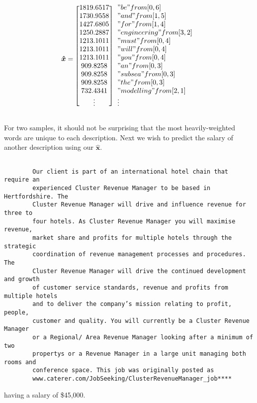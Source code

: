 \documentclass[12pt]{article}
\begin{document}
    \begin{equation*}
        \bm{\hat{x}} = 
        \begin{blockarray}{[c] l}
            1819.6517 & "be" from [0, 6] \\
            1730.9558 & "and" from [1, 5] \\
            1427.6805 & "for" from [1, 4] \\
            1250.2887 & "engineering" from [3, 2] \\
            1213.1011 & "must" from [0, 4] \\
            1213.1011 & "will" from [0, 4] \\
            1213.1011 & "you" from [0, 4] \\
            909.8258 & "an" from [0, 3] \\
            909.8258 & "subsea" from [0, 3] \\
            909.8258 & "the" from [0, 3] \\
            732.4341 & "modelling" from [2, 1] \\
        \vdots & \vdots
        \end{blockarray}
    \end{equation*}

    For two samples, it should not be surprising that the most heavily-weighted
    words are unique to each description. Next we wish to predict the salary of
    another description using our $\bm{\hat{x}}$. 

    \begin{lstlisting}
    
        Our client is part of an international hotel chain that require an
        experienced Cluster Revenue Manager to be based in Hertfordshire. The
        Cluster Revenue Manager will drive and influence revenue for three to
        four hotels. As Cluster Revenue Manager you will maximise revenue,
        market share and profits for multiple hotels through the strategic
        coordination of revenue management processes and procedures. The
        Cluster Revenue Manager will drive the continued development and growth
        of customer service standards, revenue and profits from multiple hotels
        and to deliver the company’s mission relating to profit, people,
        customer and quality. You will currently be a Cluster Revenue Manager
        or a Regional/ Area Revenue Manager looking after a minimum of two
        propertys or a Revenue Manager in a large unit managing both rooms and
        conference space. This job was originally posted as
        www.caterer.com/JobSeeking/ClusterRevenueManager_job****

    \end{lstlisting} having a salary of \$45,000.
\end{document}
